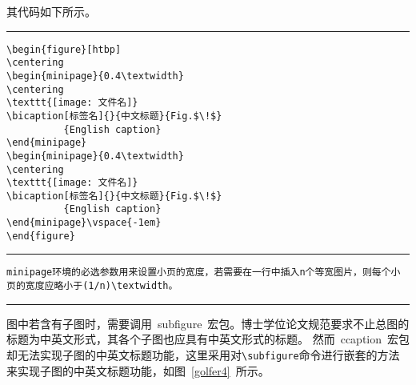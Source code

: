 其代码如下所示。
\vspace{1em}\noindent\hrule
\begin{verbatim}
\begin{figure}[htbp]
\centering
\begin{minipage}{0.4\textwidth}
\centering
\texttt{[image: 文件名]}
\bicaption[标签名]{}{中文标题}{Fig.$\!$}
          {English caption}
\end{minipage}
\begin{minipage}{0.4\textwidth}
\centering
\texttt{[image: 文件名]}
\bicaption[标签名]{}{中文标题}{Fig.$\!$}
          {English caption}
\end{minipage}\vspace{-1em}
\end{figure}
\end{verbatim}
\noindent\hrule
\begin{verbatim}
minipage环境的必选参数用来设置小页的宽度，若需要在一行中插入n个等宽图片，则每个小页的宽度应略小于(1/n)\textwidth。
\end{verbatim}
\noindent\hrule


图中若含有子图时，需要调用~subfigure~宏包。博士学位论文规范要求不止总图的标题为中英文形式，其各个子图也应具有中英文形式的标题。
然而~ccaption~宏包却无法实现子图的中英文标题功能，这里采用对\verb|\subfigure|命令进行嵌套的方法来实现子图的中英文标题功能，如图~\ref{golfer4}~所示。

\begin{figure}[htbp]
\centering
\subfigure{\label{golfer41}}\addtocounter{subfigure}{-2}
\subfigure{\label{golfer42}}\addtocounter{subfigure}{-2}
\vspace{-1em}
\end{figure}

